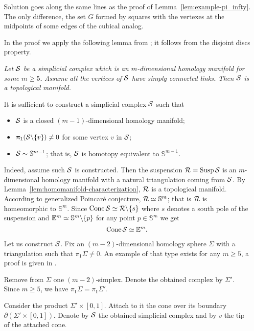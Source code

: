 Solution goes along the same lines as the proof of Lemma~\ref{lem:example-pi_infty}.
The only difference, the set $G$ formed by squares with the vertexes at the  midpoints of some edges of the cubical analog. 
\qeds

In the proof we apply the following lemma from \cite{edwards}; 
it follows from the disjoint discs property.

\medskip

\textit{Let $\mathcal{S}$ be a simplicial complex which 
is an $m$-dimensional homology manifold for some $m\ge 5$.
Assume all the vertices of
$\mathcal{S}$ have simply connected links.
Then $\mathcal{S}$ is a topological manifold.}

\medskip


It is sufficient to construct a simplicial complex $\mathcal{S}$
such that 
\begin{itemize}
\item $\mathcal{S}$ is a closed $(m-1)$-dimensional homology manifold;
\item $\uppi_1(\mathcal{S}\backslash\{v\})\ne0$ for some vertex $v$ in $\mathcal{S}$;
\item $\mathcal{S}\sim \mathbb{S}^{m-1}$; that is, $\mathcal{S}$ is homotopy equivalent to $\mathbb{S}^{m-1}$.
\end{itemize}

Indeed, assume such $\mathcal{S}$ is constructed.
Then the suspension
$\spc{R}\z=\Susp\spc{S}$
is an $m$-dimensional homology manifold with a natural triangulation coming from $\mathcal{S}$.
By Lemma~\ref{lem:homomanifold-characterization},
$\mathcal{R}$ is a topological manifold.
According to generalized Poincar\'{e} conjecture,
$\mathcal{R}\simeq\mathbb{S}^m$;
that is
$\mathcal{R}$ is homeomorphic to $\mathbb{S}^m$.
Since $\mathop{\rm Cone}\nolimits \mathcal{S}\simeq \mathcal{R}\backslash\{s\}$ where $s$ denotes a south pole of the suspension 
and $\mathbb{E}^m\simeq \mathbb{S}^m\backslash\{p\}$
for any point $p\in \mathbb{S}^m$
we get 
\[\mathop{\rm Cone}\nolimits \mathcal{S}\simeq\mathbb{E}^m.\]

Let us construct $\mathcal{S}$.
Fix an $(m-2)$-dimensional homology sphere $\Sigma$ with a triangulation such that $\pi_1\Sigma\ne0$.
An example of that type exists for any $m\ge 5$, a proof is given in \cite{kervaire}.

Remove from $\Sigma$ one $(m-2)$-simplex.
Denote the obtained complex by $\Sigma'$.
Since $m\ge 5$, we have $\pi_1\Sigma=\pi_1\Sigma'$.

Consider the product $\Sigma'\times [0,1]$. 
Attach to it the cone over its boundary $\partial (\Sigma'\times [0,1])$.
Denote by $\mathcal{S}$ the obtained simplicial complex
and by $v$ the tip of the attached cone.

